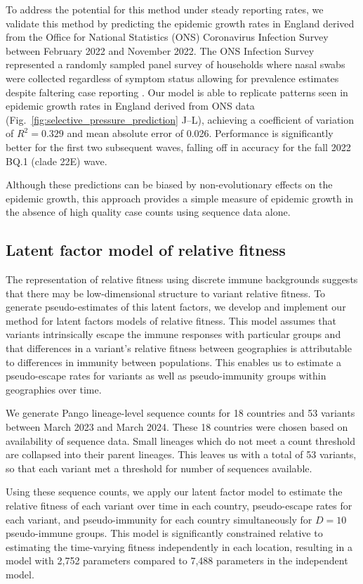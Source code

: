 \documentclass[11pt,oneside,letterpaper]{article}
\begin{document}
To address the potential for this method under steady reporting rates, we validate this method by predicting the epidemic growth rates in England derived from the Office for National Statistics (ONS) Coronavirus Infection Survey between February 2022 and November 2022.
The ONS Infection Survey represented a randomly sampled panel survey of households where nasal swabs were collected regardless of symptom status allowing for prevalence estimates despite faltering case reporting \cite{pouwels2021community}.
Our model is able to replicate patterns seen in epidemic growth rates in England derived from ONS data (Fig.~\ref{fig:selective_pressure_prediction} J--L), achieving a coefficient of variation of $R^2 = 0.329$ and mean absolute error of 0.026.
Performance is significantly better for the first two subsequent waves, falling off in accuracy for the fall 2022 BQ.1 (clade 22E) wave.

Although these predictions can be biased by non-evolutionary effects on the epidemic growth, this approach provides a simple measure of epidemic growth in the absence of high quality case counts using sequence data alone.

\subsection*{Latent factor model of relative fitness}

The representation of relative fitness using discrete immune backgrounds suggests that there may be low-dimensional structure to variant relative fitness.
To generate pseudo-estimates of this latent factors, we develop and implement our method for latent factors models of relative fitness.
This model assumes that variants intrinsically escape the immune responses with particular groups and that differences in a variant's relative fitness between geographies is attributable to differences in immunity between populations.
This enables us to estimate a pseudo-escape rates for variants as well as pseudo-immunity groups within geographies over time.

We generate Pango lineage-level sequence counts for 18 countries and 53 variants between March 2023 and March 2024.
These 18 countries were chosen based on availability of sequence data.
Small lineages which do not meet a count threshold are collapsed into their parent lineages.
This leaves us with a total of 53 variants, so that each variant met a threshold for number of sequences available.

Using these sequence counts, we apply our latent factor model to estimate the relative fitness of each variant over time in each country, pseudo-escape rates for each variant, and pseudo-immunity for each country simultaneously for $D=10$ pseudo-immune groups.
This model is significantly constrained relative to estimating the time-varying fitness independently in each location, resulting in a model with 2,752 parameters compared to 7,488 parameters in the independent model.
\end{document}

